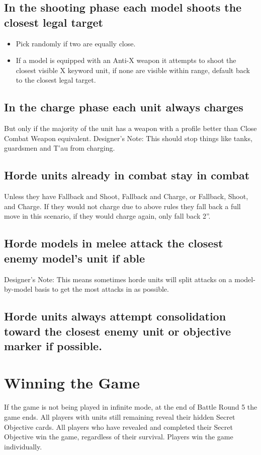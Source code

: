 \documentclass{HordeModeTarot}
\begin{document}
\subsection{In the shooting phase each model shoots the closest legal target}
\begin{itemize}
\item Pick randomly if two are equally close.
\item If a model is equipped with an Anti-X weapon it attempts to shoot the closest visible X keyword unit, if none are visible within range, default back to the closest legal target.
\end{itemize}

\subsection{In the charge phase each unit always charges}
But only if the majority of the unit has a weapon with a profile better than Close Combat Weapon equivalent. 
Designer’s Note: This should stop things like tanks, guardsmen and T’au from charging.

\subsection{Horde units already in combat stay in combat} 
Unless they have Fallback and Shoot, Fallback and Charge, or Fallback, Shoot, and Charge. If they would not charge due to above rules they fall back a full move in this scenario, if they would charge again, only fall back 2”.

\subsection{Horde models in melee attack the closest enemy model’s unit if able}
Designer’s Note: This means sometimes horde units will split attacks on a model-by-model basis to get the most attacks in as possible.

\subsection{Horde units always attempt consolidation toward the closest enemy unit or objective marker if possible.}

\section{Winning the Game}
If the game is not being played in infinite mode, at the end of Battle Round 5 the game ends. All players with units still remaining reveal their hidden Secret Objective cards. All players who have revealed and completed their Secret Objective win the game, regardless of their survival. Players win the game individually.
\end{document}
